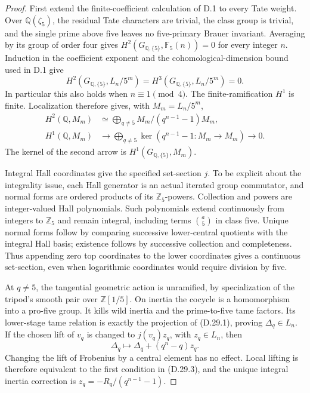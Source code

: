 \begin{proof}
First extend the finite-coefficient
calculation of D.1 to every Tate weight.
Over \(\mathbb Q(\zeta_5)\), the
residual Tate characters are trivial,
the class group is trivial, and the
single prime above five leaves no
five-primary Brauer invariant. Averaging
by its group of order four gives
\(H^2(G_{\mathbb Q,\{5\}},\mathbb F_5(n))=0\)
for every integer \(n\). Induction in
the coefficient exponent and the
cohomological-dimension bound used in
D.1 give
\[
 H^2(G_{\mathbb Q,\{5\}},L_n/5^m)=
 H^3(G_{\mathbb Q,\{5\}},L_n/5^m)=0.            \tag{D.29.4}
\]
In particular this also holds when
\(n\equiv1\pmod4\). The finite-ramification
\(H^1\) is finite. Localization therefore
gives, with \(M_m=L_n/5^m\),
\[
\begin{split}
 H^2(\mathbb Q,M_m)&\simeq
       \bigoplus_{q\ne5}M_m/(q^{n-1}-1)M_m,\\
 H^1(\mathbb Q,M_m)&\longrightarrow
       \bigoplus_{q\ne5}\ker(q^{n-1}-1:M_m\to M_m)
                     \longrightarrow0.
\end{split}
\tag{D.29.5}
\]
The kernel of the second arrow is
\(H^1(G_{\mathbb Q,\{5\}},M_m)\).

Integral Hall coordinates give the
specified set-section \(j\). To be
explicit about the integrality issue,
each Hall generator is an actual iterated
group commutator, and normal forms are
ordered products of its \(\mathbb Z_5\)-powers.
Collection and powers are integer-valued
Hall polynomials. Such polynomials extend
continuously from integers to \(\mathbb Z_5\)
and remain integral, including terms
\(\binom{a}{5}\) in class five. Unique
normal forms follow by comparing successive
lower-central quotients with the integral
Hall basis; existence follows by successive
collection and completeness. Thus appending zero
top coordinates to the lower coordinates
gives a continuous set-section, even when logarithmic
coordinates would require division by five.

At \(q\ne5\), the tangential geometric
action is unramified, by specialization
of the tripod's smooth pair over
\(\mathbb Z[1/5]\). On inertia the cocycle
is a homomorphism into a pro-five group.
It kills wild inertia and the prime-to-five
tame factors. Its lower-stage tame
relation is exactly the projection of
(D.29.1), proving \(\Delta_q\in L_n\).
If the chosen lift of \(v_q\) is changed
to \(j(v_q)z_q\), with \(z_q\in L_n\),
then
\[
          \Delta_q\longmapsto
            \Delta_q+(q^n-q)z_q.               \tag{D.29.6}
\]
Changing the lift of Frobenius by a
central element has no effect. Local
lifting is therefore equivalent to
the first condition in (D.29.3), and
the unique integral inertia correction
is \(z_q=-R_q/(q^{n-1}-1)\).


\end{proof}
